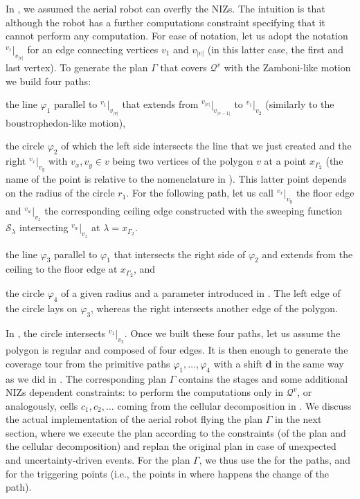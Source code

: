 In , we assumed the aerial robot can overfly the NIZs. The intuition is that although the robot has a further computations constraint specifying that it cannot perform any computation. For ease of notation, let us adopt the notation ${}^{v_1}|_{v_{|v|}}$ for an edge connecting vertices $v_1$ and $v_{|v|}$ (in this latter case, the first and last vertex). To generate the plan $\Gamma$ that covers $\mathcal{Q}^v$ with the Zamboni-like motion we build four paths:
\begin{enumerate*}[label={(\alph*)},font={\textit}]
  \item the line $\varphi_1$ parallel to ${}^{v_1}|_{v_{|v|}}$ that extends from ${}^{v_{|v|}}|_{v_{|v-1|}}$ to ${}^{v_{1}}|_{v_{2}}$ (similarly to the boustrophedon-like motion),
  \item the circle $\varphi_2$ of which the left side intersects the line that we just created and the right ${}^{v_x}|_{v_y}$ with $v_x,v_y\in v$ being two vertices of the polygon $v$ at a point $x_{\Gamma_2}$ (the name of the point is relative to the nomenclature in ). This latter point depends on the radius of the circle $r_1$. For the following path, let us call ${}^{v_x}|_{v_y}$ the floor edge and ${}^{v_w}|_{v_z}$ the corresponding ceiling edge constructed with the sweeping function $\mathcal{S}_{\lambda}$ intersecting  ${}^{v_w}|_{v_z}$ at $\lambda=x_{\Gamma_2}$. 
  \item the line $\varphi_3$ parallel to $\varphi_1$ that intersects the right side of $\varphi_2$ and extends from the ceiling to the floor edge at $x_{\Gamma_2}$, and
  \item the circle $\varphi_4$ of a given radius and a parameter introduced in . The left edge of the circle lays on $\varphi_3$, whereas the right intersects another edge of the polygon. 
\end{enumerate*}
In , the circle intersects ${}^{v_1}|_{v_2}$. Once we built these four paths, let us assume the polygon is regular and composed of four edges. It is then enough to generate the coverage tour from the primitive paths $\varphi_1,\dots,\varphi_4$ with a shift $\mathbf{d}$ in the same way as we did in . The corresponding plan $\Gamma$ contains the stages and some additional NIZs dependent constraints: to perform the computations only in $\mathcal{Q}^v$, or analogously, cells $c_1,c_2,\dots$ coming from the cellular decomposition in . We discuss the actual implementation of the aerial robot flying the plan $\Gamma$ in the next section, where we execute the plan according to the constraints (of the plan and the cellular decomposition) and replan the original plan in case of unexpected and uncertainty-driven events. For the plan $\Gamma$, we thus use the  for the paths, and  for the triggering points (i.e., the points in  where happens the change of the path).

